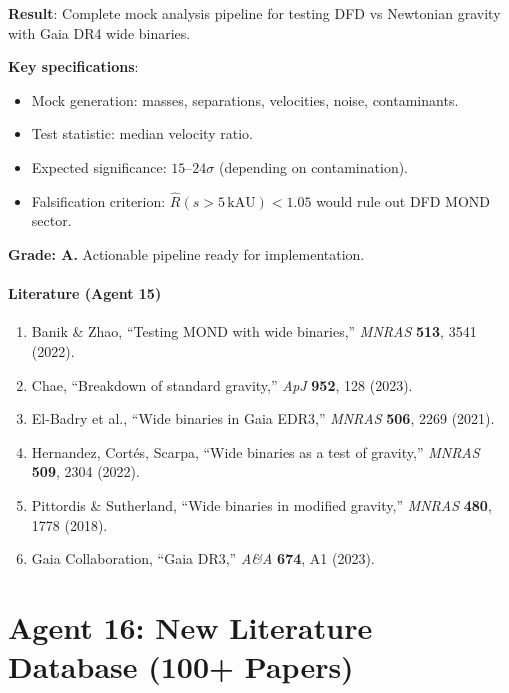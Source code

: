 \documentclass[11pt,a4paper]{article}
\begin{document}
\begin{tcolorbox}[colback=green!5!white, colframe=green!60!black, title={Agent 15: Gaia DR4 Mock Pipeline --- SPECIFIED}]
\textbf{Result}: Complete mock analysis pipeline for testing DFD vs Newtonian gravity with Gaia DR4 wide binaries.

\textbf{Key specifications}:
\begin{itemize}
\item Mock generation: masses, separations, velocities, noise, contaminants.
\item Test statistic: median velocity ratio.
\item Expected significance: $15$--$24\sigma$ (depending on contamination).
\item Falsification criterion: $\hat{R}(s > 5\,\text{kAU}) < 1.05$ would rule out DFD MOND sector.
\end{itemize}

\textbf{Grade: A.} Actionable pipeline ready for implementation.
\end{tcolorbox}

\subsection{Literature (Agent 15)}

\begin{enumerate}
\item Banik \& Zhao, ``Testing MOND with wide binaries,'' \textit{MNRAS} \textbf{513}, 3541 (2022).
\item Chae, ``Breakdown of standard gravity,'' \textit{ApJ} \textbf{952}, 128 (2023).
\item El-Badry et al., ``Wide binaries in Gaia EDR3,'' \textit{MNRAS} \textbf{506}, 2269 (2021).
\item Hernandez, Cort\'es, Scarpa, ``Wide binaries as a test of gravity,'' \textit{MNRAS} \textbf{509}, 2304 (2022).
\item Pittordis \& Sutherland, ``Wide binaries in modified gravity,'' \textit{MNRAS} \textbf{480}, 1778 (2018).
\item Gaia Collaboration, ``Gaia DR3,'' \textit{A\&A} \textbf{674}, A1 (2023).
\end{enumerate}


\part{Agent 16: New Literature Database (100+ Papers)}
\label{part:literature}
\end{document}
